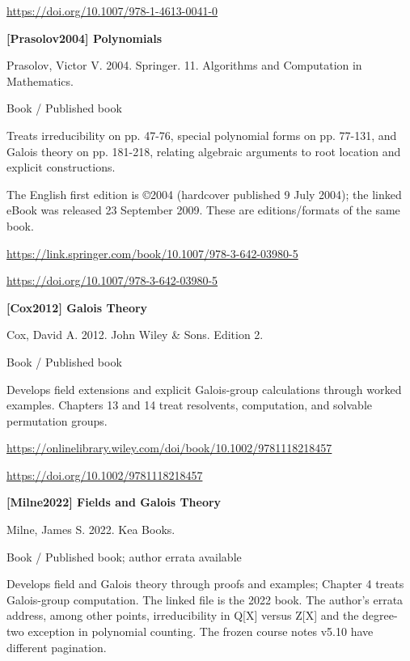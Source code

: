 \documentclass[11pt,a4paper,oneside,openany]{book}
\begin{document}
{\footnotesize\url{https://doi.org/10.1007/978-1-4613-0041-0}}\par
\vspace{9pt}
\hypertarget{ref:Prasolov2004}{}
{\sffamily\bfseries\color{atlasgreen}[Prasolov2004] Polynomials}\par
\color{black} Prasolov, Victor V. 2004. Springer. 11. Algorithms and Computation in Mathematics.\par
{\small\sffamily\color{atlasgold}Book / Published book}\par
\color{black} Treats irreducibility on pp. 47-76, special polynomial forms on pp. 77-131, and Galois theory on pp. 181-218, relating algebraic arguments to root location and explicit constructions.\par
{\small The English first edition is ©2004 (hardcover published 9 July 2004); the linked eBook was released 23 September 2009. These are editions/formats of the same book.}\par
{\footnotesize\url{https://link.springer.com/book/10.1007/978-3-642-03980-5}}\par
{\footnotesize\url{https://doi.org/10.1007/978-3-642-03980-5}}\par
\vspace{9pt}
\hypertarget{ref:Cox2012}{}
{\sffamily\bfseries\color{atlasgreen}[Cox2012] Galois Theory}\par
\color{black} Cox, David A. 2012. John Wiley \& Sons. Edition 2.\par
{\small\sffamily\color{atlasgold}Book / Published book}\par
\color{black} Develops field extensions and explicit Galois-group calculations through worked examples. Chapters 13 and 14 treat resolvents, computation, and solvable permutation groups.\par
{\footnotesize\url{https://onlinelibrary.wiley.com/doi/book/10.1002/9781118218457}}\par
{\footnotesize\url{https://doi.org/10.1002/9781118218457}}\par
\vspace{9pt}
\hypertarget{ref:Milne2022}{}
{\sffamily\bfseries\color{atlasgreen}[Milne2022] Fields and Galois Theory}\par
\color{black} Milne, James S. 2022. Kea Books.\par
{\small\sffamily\color{atlasgold}Book / Published book; author errata available}\par
\color{black} Develops field and Galois theory through proofs and examples; Chapter 4 treats Galois-group computation. The linked file is the 2022 book. The author's errata address, among other points, irreducibility in Q[X] versus Z[X] and the degree-two exception in polynomial counting. The frozen course notes v5.10 have different pagination.\par
\end{document}
